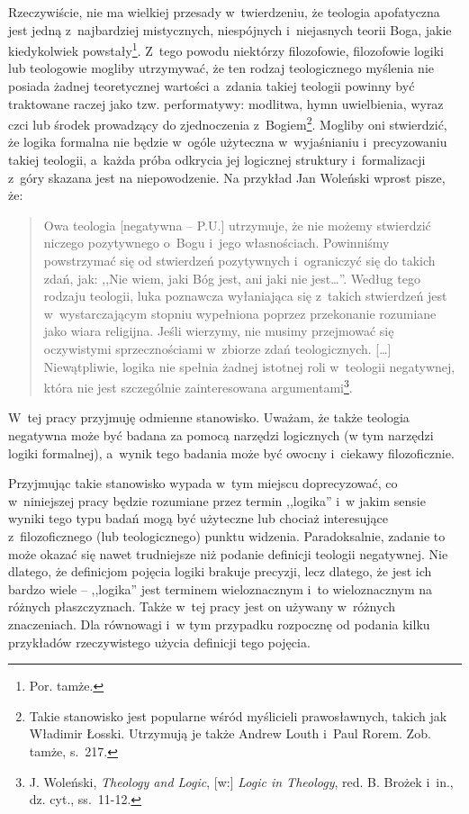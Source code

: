 Rzeczywiście, nie ma wielkiej przesady w~twierdzeniu, że teologia apofatyczna jest jedną z~najbardziej mistycznych, niespójnych i~niejasnych teorii Boga, jakie kiedykolwiek powstały\footnote{Por. tamże. }. Z~tego powodu niektórzy filozofowie, filozofowie logiki lub teologowie mogliby utrzymywać, że ten rodzaj teologicznego myślenia nie posiada żadnej teoretycznej wartości a~zdania takiej teologii powinny być traktowane raczej jako tzw. performatywy: modlitwa, hymn uwielbienia, wyraz czci lub środek prowadzący do zjednoczenia z~Bogiem\footnote{Takie stanowisko jest popularne wśród myślicieli prawosławnych, takich jak Władimir Łosski. Utrzymują je także Andrew Louth i~Paul Rorem. Zob. tamże, s.~217.}. Mogliby oni stwierdzić, że logika formalna nie będzie w~ogóle użyteczna w~wyjaśnianiu i~precyzowaniu takiej teologii, a~każda próba odkrycia jej logicznej struktury i~formalizacji z~góry skazana jest na niepowodzenie. Na przykład Jan Woleński wprost pisze, że:

\begin{quote}
Owa teologia [negatywna -- P.U.] utrzymuje, że nie możemy stwierdzić niczego pozytywnego o~Bogu i~jego własnościach. Powinniśmy powstrzymać się od stwierdzeń pozytywnych i~ograniczyć się do takich zdań, jak: ,,Nie wiem, jaki Bóg jest, ani jaki nie jest\ldots''. Według tego rodzaju teologii, luka poznawcza wyłaniająca się z~takich stwierdzeń jest w~wystarczającym stopniu wypełniona poprzez przekonanie rozumiane jako wiara religijna. Jeśli wierzymy, nie musimy przejmować się oczywistymi sprzecznościami w~zbiorze zdań teologicznych. [\ldots] Niewątpliwie, logika nie spełnia żadnej istotnej roli w~teologii negatywnej, która nie jest szczególnie zainteresowana argumentami\footnote{J. Woleński, \textit{Theology and Logic}, [w:] \textit{Logic in Theology}, red. B. Brożek i~in., dz. cyt., ss.~11-12.}.
\end{quote}
W~tej pracy przyjmuję odmienne stanowisko. Uważam, że także teologia negatywna może być badana za pomocą narzędzi logicznych (w tym narzędzi logiki formalnej), a~wynik tego badania może być owocny i~ciekawy filozoficznie.

Przyjmując takie stanowisko wypada w~tym miejscu doprecyzować, co w~niniejszej pracy będzie rozumiane przez termin ,,logika'' i~w jakim sensie wyniki tego typu badań mogą być użyteczne lub chociaż interesujące z~filozoficznego (lub teologicznego) punktu widzenia. Paradoksalnie, zadanie to może okazać się nawet trudniejsze niż podanie definicji teologii negatywnej. Nie dlatego, że definicjom pojęcia logiki brakuje precyzji, lecz dlatego, że jest ich bardzo wiele -- ,,logika'' jest terminem wieloznacznym i~to wieloznacznym na różnych płaszczyznach. Także w~tej pracy jest on używany w~różnych znaczeniach. Dla równowagi i~w tym przypadku rozpocznę od podania kilku przykładów rzeczywistego użycia definicji tego pojęcia.


